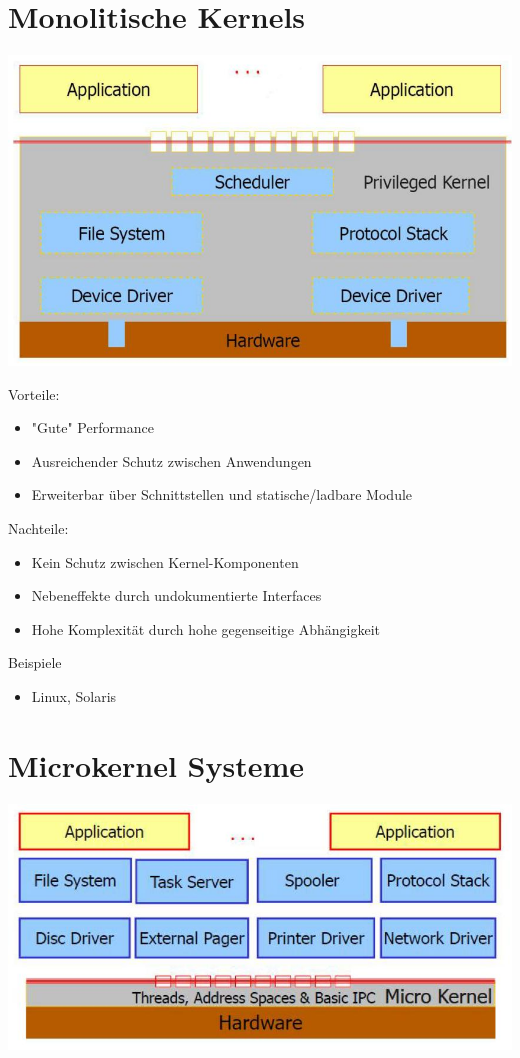 \documentclass[a4paper]{scrreprt}
\begin{document}
\section{Monolitische Kernels}
	\begin{center}
		\includegraphics[scale=0.3] {monolithickernel.png}
	\end{center}
	Vorteile:
		\begin{itemize}
			\item "Gute" Performance
			\item Ausreichender Schutz zwischen Anwendungen
			\item Erweiterbar über Schnittstellen und statische/ladbare Module
		\end{itemize}
	Nachteile:
		\begin{itemize}
			\item Kein Schutz zwischen Kernel-Komponenten
			\item Nebeneffekte durch undokumentierte Interfaces
			\item Hohe Komplexität durch hohe gegenseitige Abhängigkeit
		\end{itemize}
	Beispiele
		\begin{itemize}
			\item Linux, Solaris
		\end{itemize}

\section{Microkernel Systeme}
	\begin{center}
		\includegraphics[scale=0.3] {microkernel.png}
	\end{center}
\end{document}
